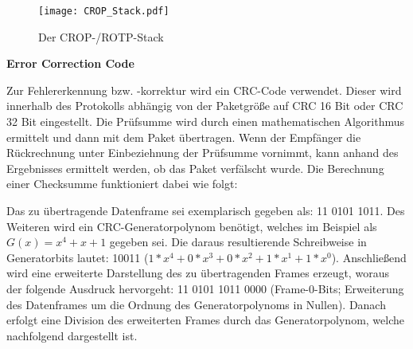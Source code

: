\begin{figure}[H]
	\centering
	\texttt{[image: CROP\_Stack.pdf]}
	\caption{Der CROP-/ROTP-Stack}
	\label{fig:CROP_Stack}
\end{figure}

\textbf{Error Correction Code}

Zur Fehlererkennung bzw. -korrektur wird ein \gls{CRC}-Code verwendet.
Dieser wird innerhalb des Protokolls abhängig von der Paketgr{\"o}{\ss}e auf
\gls{CRC} 16 Bit oder \gls{CRC} 32 Bit eingestellt. Die Pr{\"u}fsumme wird durch
einen mathematischen Algorithmus ermittelt und dann mit dem Paket {\"u}bertragen. Wenn der
Empf{\"a}nger die R{\"u}ckrechnung unter Einbeziehnung der Pr{\"u}fsumme
vornimmt, kann anhand des Ergebnisses ermittelt werden, ob das Paket
verf{\"a}lscht wurde. Die Berechnung einer Checksumme funktioniert dabei wie
folgt:

Das zu {\"u}bertragende Datenframe sei exemplarisch gegeben als: 11 0101 1011.
Des Weiteren wird ein CRC-Generatorpolynom ben{\"o}tigt, welches im Beispiel als
$G(x) = x^4 + x + 1$ gegeben sei. Die daraus resultierende Schreibweise in Generatorbits lautet: 10011
($1*x^4+0*x^3+0*x^2+1*x^1+1*x^0$).
Anschließend wird eine erweiterte Darstellung des zu {\"u}bertragenden Frames
erzeugt, woraus der folgende Ausdruck hervorgeht: 11 0101 1011 0000
(Frame-0-Bits; Erweiterung des Datenframes um die Ordnung des Generatorpolynoms
in Nullen). Danach erfolgt eine Division des erweiterten Frames durch das
Generatorpolynom, welche nachfolgend dargestellt ist.

\makeatletter
\def\cline#1{\noalign{\vskip-2ex}\@cline#1\@nil}
\makeatother


